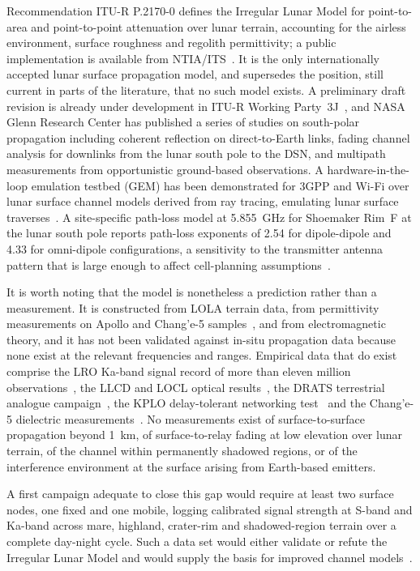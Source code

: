 \documentclass[11pt,a4paper]{article}
\begin{document}
Recommendation ITU-R P.2170-0 defines the Irregular Lunar Model for point-to-area and point-to-point attenuation over lunar terrain, accounting for the airless environment, surface roughness and regolith permittivity; a public implementation is available from NTIA/ITS~\cite{itu_p2170}. It is the only internationally accepted lunar surface propagation model, and supersedes the position, still current in parts of the literature, that no such model exists. A preliminary draft revision is already under development in ITU-R Working Party~3J~\cite{itu_p2170_revision}, and NASA Glenn Research Center has published a series of studies on south-polar propagation including coherent reflection on direct-to-Earth links, fading channel analysis for downlinks from the lunar south pole to the DSN, and multipath measurements from opportunistic ground-based observations. A hardware-in-the-loop emulation testbed (GEM) has been demonstrated for 3GPP and Wi-Fi over lunar surface channel models derived from ray tracing, emulating lunar surface traverses~\cite{nasa_gem_2026}. A site-specific path-loss model at \SI{5.855}{GHz} for Shoemaker Rim~F at the lunar south pole reports path-loss exponents of 2.54 for dipole-dipole and 4.33 for omni-dipole configurations, a sensitivity to the transmitter antenna pattern that is large enough to affect cell-planning assumptions~\cite{shoemaker_rim_2026}.

It is worth noting that the model is nonetheless a prediction rather than a measurement. It is constructed from LOLA terrain data, from permittivity measurements on Apollo and Chang'e-5 samples~\cite{olhoeft_strangway1975,dong_dielectric_ce5}, and from electromagnetic theory, and it has not been validated against in-situ propagation data because none exist at the relevant frequencies and ranges. Empirical data that do exist comprise the LRO Ka-band signal record of more than eleven million observations~\cite{lro_ka_analysis}, the LLCD and LOCL optical results~\cite{boroson_llcd,giggenbach_locl}, the DRATS terrestrial analogue campaign~\cite{nasa_drats2022}, the KPLO delay-tolerant networking test~\cite{kim_kplo_dtn} and the Chang'e-5 dielectric measurements~\cite{dong_dielectric_ce5}. No measurements exist of surface-to-surface propagation beyond \SI{1}{km}, of surface-to-relay fading at low elevation over lunar terrain, of the channel within permanently shadowed regions, or of the interference environment at the surface arising from Earth-based emitters.

A first campaign adequate to close this gap would require at least two surface nodes, one fixed and one mobile, logging calibrated signal strength at S-band and Ka-band across mare, highland, crater-rim and shadowed-region terrain over a complete day-night cycle. Such a data set would either validate or refute the Irregular Lunar Model and would supply the basis for improved channel models~\cite{itu_p2170,zhu_channel_ray}.
\end{document}
